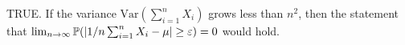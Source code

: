 
TRUE. If the variance $ \mathrm{Var}( \sum_{i=1}^{n} X_{i}  )$ grows less than $ n^2$, then the
statement that $ \lim_{n \to \infty} \P(|1/n \sum_{i=1}^{n} X_{i} - \mu| \geq \epsilon) = 0$ would
hold.
